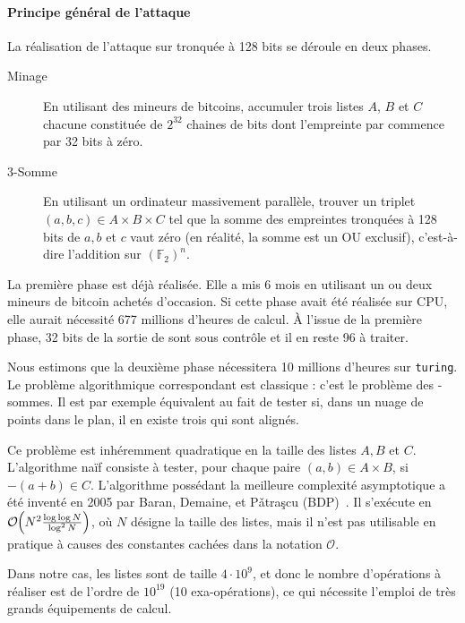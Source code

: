 \documentclass[
    a4paper, 
    12pt, onecolumn,
]{article}
\newcommand{\bigO}[1]{\mathcal{O}\hspace{-2px}\left(#1\right)}
\begin{document}
\paragraph{Principe général de l'attaque} La réalisation de l'attaque sur \sha
tronquée à 128 bits se déroule en deux phases.

\begin{description}
\item[Minage] En utilisant des mineurs de bitcoins, accumuler trois listes $A$,
  $B$ et $C$ chacune constituée de $2^{32}$ chaines de bits dont l'empreinte par
  \sha commence par 32 bits à zéro.

\item[3-Somme] En utilisant un ordinateur massivement parallèle, trouver un
  triplet $(a,b,c) \in A \times B \times C$ tel que la somme des empreintes
  tronquées à 128 bits de $a, b$ et $c$ vaut zéro (en réalité, la \og somme\fg{}
  est un OU exclusif), c'est-à-dire l'addition sur $(\mathbb{F}_2)^n$.
\end{description}

La première phase est déjà réalisée. Elle a mis 6 mois en utilisant un ou deux
mineurs de bitcoin achetés d'occasion. Si cette phase avait été réalisée sur
CPU, elle aurait nécessité 677 millions d'heures de calcul. À l'issue de la
première phase, 32 bits de la sortie de \sha sont sous contrôle et il en reste
96 à traiter.

Nous estimons que la deuxième phase nécessitera 10 millions d'heures sur
\texttt{turing}. Le problème algorithmique correspondant est classique : c'est
le problème des -sommes\fg{}. Il est par exemple équivalent au fait de
tester si, dans un nuage de points dans le plan, il en existe trois qui sont
alignés.

Ce problème est inhéremment quadratique en la taille des listes $A, B$ et
$C$. L'algorithme naïf consiste à tester, pour chaque paire
$(a, b) \in A \times B$, si $-(a+b) \in C$. L'algorithme possédant la meilleure
complexité asymptotique a été inventé en 2005 par Baran, Demaine, et
P{\v{a}}tra{\c{s}}cu (BDP)~\cite{BDP2005}. Il s'exécute en
$\bigO{N^2 \frac{\log \log N}{\log^2 N}}$, où $N$ désigne la taille des listes,
mais il n'est pas utilisable en pratique à causes des constantes cachées dans la
notation $\mathcal{O}$.

Dans notre cas, les listes sont de taille $4 \cdot 10^{9}$, et donc le nombre
d'opérations à réaliser est de l'ordre de $10^{19}$ (10 exa-opérations), ce qui
nécessite l'emploi de très grands équipements de calcul.
\end{document}
